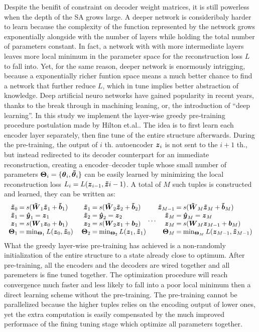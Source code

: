 Despite the benifit of constraint on decoder weight matrices, it is still powerless when the depth of the SA grows large. A deeper network is consideribaly harder to learn because the complexity of the function represented by the network grows exponentially alongside with the number of layers while holding the total number of parameters constant. In fact, a network with with more intermediate layers leaves more local minimum in the parameter space for the reconstruction loss $L$ to fall into. Yet, for the same reason, deeper network is enormously intrigging, because a exponentially richer funtion space means a much better chance to find a network that further reduce $L$, which in tune implies better abstraction of knowledge. Deep artificial neuro networks have gained popularity in recent years, thanks to the break through in machining leaning, or, the introduction of ``deep learning''. In this study we implement the layer-wise greedy pre-training procedure postulation made by Hilton et.al.\cite{DL:Greedy}. The idea is to first learn each encoder layer separately, then fine tune of the entire structure afterwards. During the pre-training, the output of $i$ th. autoencoder $\boldsymbol{z}_i$ is not sent to the $i+1$ th., but instead redirected to its decoder counterpart for an immediate reconstruction, creating a encoder--decoder tuple whose small number of parameters $\boldsymbol{\Theta}_i=\{\boldsymbol{\theta}_i, \boldsymbol{\tilde{\theta}}_i\}$ can be easily learned by minimizing the local reconstruction loss $L_i=L(\boldsymbol{z}_{i-1}, \boldsymbol{\tilde{z}}{i-1})$. A total of $M$ such tuples is constructed and learned, they can be written as:
\newcommand{\ED}[2]
{
  \arraycolsep=1.2pt
  \begin{array}{rcl}
    \zDC_{#1} &=& s(\WDC_{#2}\zDC_{#2} + \bDC_{#2}) \\
    \zDC_{#2} &=& \yHT_{#2} = \zEC_{#2} \\
    \zEC_{#2} &=& s(\WEC_{#2}\zEC_{#1} + \bEC_{#2}) \\
    \Par_{#2} &=& \min_{\Par_#2}L(\zEC_{#1},\zDC_{#1})
  \end{array}
}
\begin{equation}\label{eq:Greedy}
\begin{array}{cc}
  \ED{0}{1} \quad \ED{1}{2} \dots \ED{M-1}{M}
\end{array}
\end{equation}
What the greedy layer-wise pre-training has achieved is a non-randomly initialization of the entire structure to a state already close to optimum. After pre-training, all the encoders and the decoders are wired together and all paremeters is fine tuned together. The optimization procedure will reach convergence much faster and less likely to fall into a poor local minimum then a direct learning scheme without the pre-training. The pre-training cannot be parallelized because the higher tuples relies on the encoding output of lower ones, yet the extra computation is easily compensated by the much improved performace of the fining tuning stage which optimize all parameters together.


